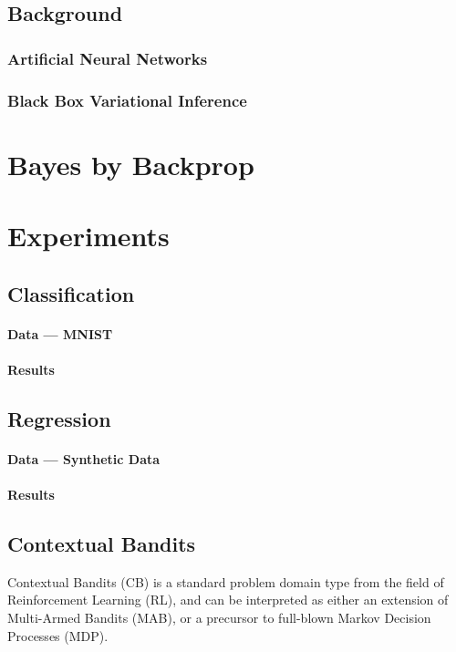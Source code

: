 \documentclass[11pt]{article}
\begin{document}
\subsection{Background}

\subsubsection{Artificial Neural Networks}
\subsubsection{Black Box Variational Inference}

\section{Bayes by Backprop}

\section{Experiments}

\subsection{Classification}
\paragraph{Data --- MNIST}
\paragraph{Results}

\subsection{Regression}
\paragraph{Data --- Synthetic Data}
\paragraph{Results}

\subsection{Contextual Bandits}

Contextual Bandits (CB) is a standard problem domain type from the field of
Reinforcement Learning (RL), and can be interpreted as either an extension of
Multi-Armed Bandits (MAB), or a precursor to full-blown Markov Decision
Processes (MDP).
\end{document}

